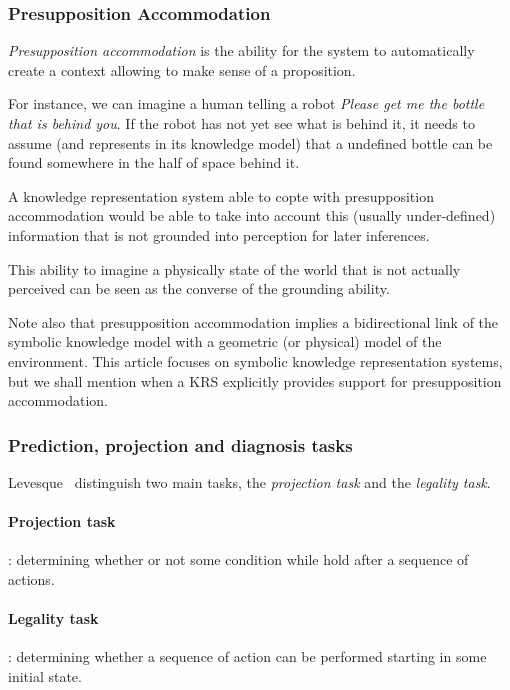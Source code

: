 \documentclass[a4paper, twocolumn]{article}
\begin{document}
\subsubsection{Presupposition Accommodation}
\label{sect|presupposition-accomodation}

\emph{Presupposition accommodation} is the ability for the system to
automatically create a context allowing to make sense of a proposition.

For instance, we can imagine a human telling a robot \emph{Please get me the
bottle that is behind you}. If the robot has not yet see what is behind it, it
needs to assume (and represents in its knowledge model) that a undefined bottle
can be found somewhere in the half of space behind it.

A knowledge representation system able to copte with presupposition
accommodation would be able to take into account this (usually under-defined)
information that is not grounded into perception for later inferences.

This ability to imagine a physically state of the world that is not actually
perceived can be seen as the converse of the grounding ability.

Note also that presupposition accommodation implies a bidirectional link of the
symbolic knowledge model with a geometric (or physical) model of the
environment. This article focuses on symbolic knowledge representation systems,
but we shall mention when a KRS explicitly provides support for presupposition
accommodation.

\subsubsection{Prediction, projection and diagnosis tasks}
\label{sect|prediction-projection}

Levesque~\cite{Levesque2008} distinguish two main tasks, the \emph{projection
task} and the \emph{legality task}.

\paragraph{Projection task}: determining whether or not some condition while
hold after a sequence of actions.

\paragraph{Legality task}: determining whether a sequence of action can be
performed starting in some initial state.
\end{document}
